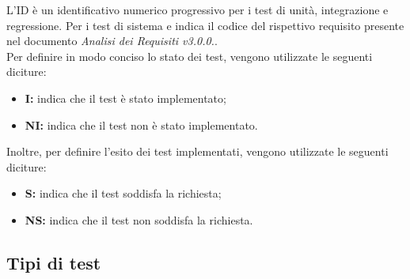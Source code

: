 L'ID è un identificativo numerico progressivo per i test di unità, integrazione e regressione. Per i test di sistema e
indica il codice del rispettivo requisito presente nel documento \textit{Analisi dei Requisiti v3.0.0.}.\\
Per definire in modo conciso lo stato dei test, vengono utilizzate le seguenti diciture:
\begin{itemize}
    \item \textbf{I:} indica che il test è stato implementato;
    \item \textbf{NI:} indica che il test non è stato implementato.
\end{itemize}
Inoltre, per definire l'esito dei test implementati, vengono utilizzate le seguenti diciture:
\begin{itemize}
    \item \textbf{S:} indica che il test soddisfa la richiesta;
    \item \textbf{NS:} indica che il test non soddisfa la richiesta.
\end{itemize}
\pagebreak
\subsection{Tipi di test}
